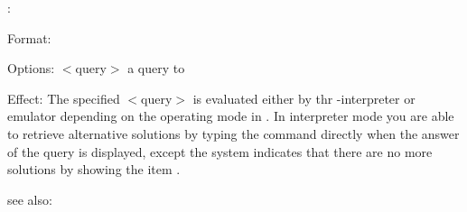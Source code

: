 
:

Format: 

Options: $<$query$>$ a query to \RELFUN{}

Effect: The specified $<$query$>$ is evaluated either by thr \RELFUN{}-interpreter
	or emulator depending on the operating mode in \FORWARD{}. In interpreter
	mode you are able to retrieve alternative solutions by typing the 
	command  directly when the answer of the query is displayed,
	except the system indicates that there are no more solutions by 
	showing the item .

see also: 
